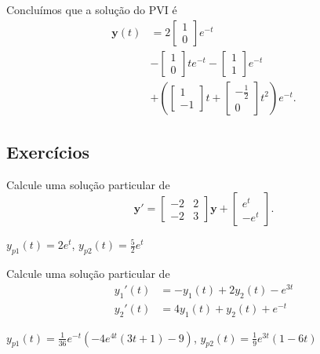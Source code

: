 \begin{resol}
  Concluímos que a solução do PVI é
  \begin{align}
    \pmb{y}(t) &= 2\begin{bmatrix}
    1 \\ 0
    \end{bmatrix}e^{-t} \\
    &- \begin{bmatrix}
      1 \\
      0
    \end{bmatrix}te^{-t} -
    \begin{bmatrix}
      1 \\ 1
    \end{bmatrix}e^{-t} \\
    &+ \left(
    \begin{bmatrix}
      1 \\
      -1
    \end{bmatrix}t +
    \begin{bmatrix}
      -\frac{1}{2} \\
      0
    \end{bmatrix}t^2\right)e^{-t}.
  \end{align}  
\end{resol}

\subsection*{Exercícios}

\begin{exer}
  Calcule uma solução particular de
  \begin{equation}
    \pmb{y}' =
    \begin{bmatrix}
      -2 & 2 \\
      -2 & 3
    \end{bmatrix}\pmb{y} +
    \begin{bmatrix}
      e^{t} \\ -e^{t}
    \end{bmatrix}.
  \end{equation}
\end{exer}
\begin{resp}
  $y_{p1}(t) = 2 e^t$, $y_{p2}(t) = \frac{5}{2} e^t$
\end{resp}

\begin{exer}
  Calcule uma solução particular de
  \begin{align}
    y_1'(t) &= -y_1(t) + 2y_2(t) - e^{3t}\\
    y_2'(t) &= 4y_1(t) + y_2(t) + e^{-t}
  \end{align}
\end{exer}
\begin{resp}
  $y_{p1}(t) = \frac{1}{36} e^{-t} (-4 e^{4t} (3 t + 1) - 9)$, $y_{p2}(t) = \frac{1}{9} e^{3t} (1 - 6 t)$
\end{resp}

